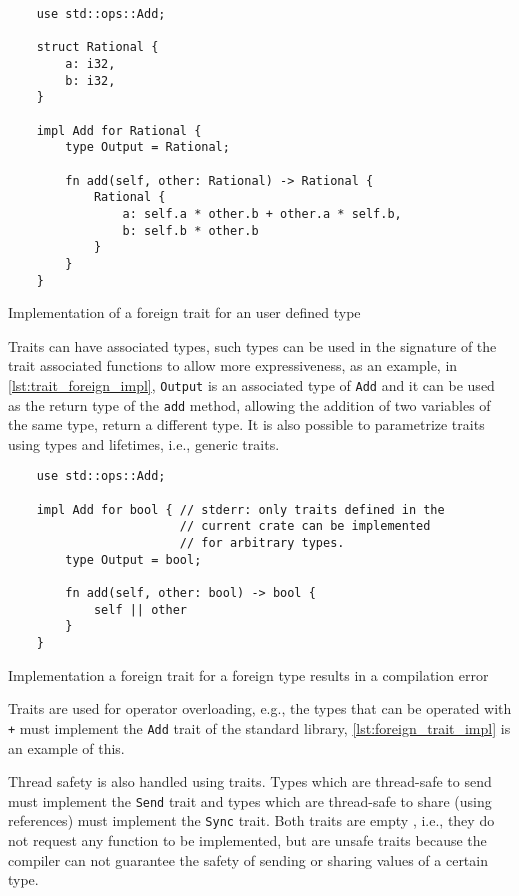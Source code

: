 \begin{listing}[ht]
	\begin{verbatim}
    use std::ops::Add;

    struct Rational {
        a: i32,
        b: i32,
    }

    impl Add for Rational {
        type Output = Rational;
        
        fn add(self, other: Rational) -> Rational {
            Rational {
                a: self.a * other.b + other.a * self.b,
                b: self.b * other.b
            }
        }
    }
    \end{verbatim}
  \caption{Implementation of a foreign trait for an user defined type}
  \label{lst:foreign_trait_impl}
\end{listing}

Traits can have associated types, such types can be used in the signature of the trait associated functions to allow more expressiveness, as an example, in \ref{lst:trait_foreign_impl}, \texttt{Output} is an associated type of \texttt{Add} and it can be used as the return type of the \texttt{add} method, allowing the addition of two variables of the same type, return a different type. It is also possible to parametrize traits using types and lifetimes, i.e., generic traits.

\begin{listing}[ht]
	\begin{verbatim}
    use std::ops::Add;

    impl Add for bool { // stderr: only traits defined in the
                        // current crate can be implemented 
                        // for arbitrary types.
        type Output = bool;
        
        fn add(self, other: bool) -> bool {
            self || other
        }
    }
    \end{verbatim}
  \caption{Implementation a foreign trait for a foreign type results in a compilation error}
  \label{lst:foreign_trait_foreign_impl}
\end{listing}

Traits are used for operator overloading, e.g., the types that can be operated with \texttt{+} must implement the \texttt{Add} trait of the standard library, \ref{lst:foreign_trait_impl} is an example of this. 

Thread safety is also handled using traits. Types which are thread-safe to send must implement the \texttt{Send} trait and types which are thread-safe to share (using references) must implement the \texttt{Sync} trait. Both traits are empty , i.e., they do not request any function to be implemented, but are unsafe traits because the compiler can not guarantee the safety of sending or sharing values of a certain type.

